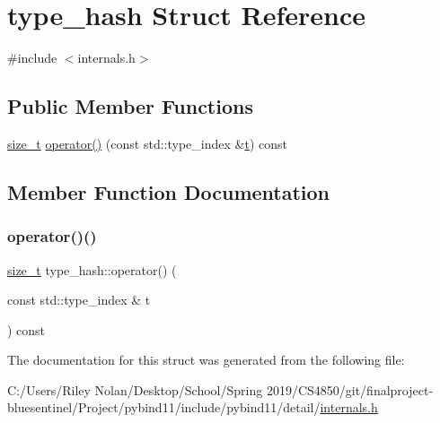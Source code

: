 \hypertarget{structtype__hash}{}\section{type\+\_\+hash Struct Reference}
\label{structtype__hash}


{\ttfamily \#include $<$internals.\+h$>$}

\subsection*{Public Member Functions}
\begin{DoxyCompactItemize}
\item 
\mbox{\hyperlink{detail_2common_8h_a801d6a451a01953ef8cbae6feb6a3638}{size\+\_\+t}} \mbox{\hyperlink{structtype__hash_a21e6e3ef4e983727e91f4ef90d056173}{operator()}} (const std\+::type\+\_\+index \&\mbox{\hyperlink{_s_d_l__opengl_8h_a7d65d00ca3b0630d9b5c52df855b19f5}{t}}) const
\end{DoxyCompactItemize}


\subsection{Member Function Documentation}
\mbox{\label{structtype__hash_a21e6e3ef4e983727e91f4ef90d056173}} 
\subsubsection{\texorpdfstring{operator()()}{operator()()}}
{\footnotesize\ttfamily \mbox{\hyperlink{detail_2common_8h_a801d6a451a01953ef8cbae6feb6a3638}{size\+\_\+t}} type\+\_\+hash\+::operator() (\begin{DoxyParamCaption}\item[{const std\+::type\+\_\+index \&}]{t }\end{DoxyParamCaption}) const\hspace{0.3cm}{\ttfamily [inline]}}



The documentation for this struct was generated from the following file\+:\begin{DoxyCompactItemize}
\item 
C\+:/\+Users/\+Riley Nolan/\+Desktop/\+School/\+Spring 2019/\+C\+S4850/git/finalproject-\/bluesentinel/\+Project/pybind11/include/pybind11/detail/\mbox{\hyperlink{internals_8h}{internals.\+h}}\end{DoxyCompactItemize}

